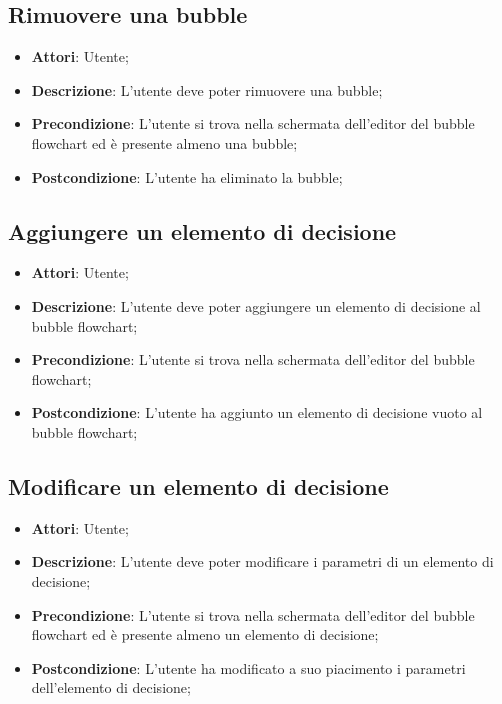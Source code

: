 \documentclass[../AnalisiDeiRequisiti.tex]{subfiles}
\begin{document}
	\subsection{Rimuovere una bubble}
	\begin{itemize}
		\item \textbf{Attori}: Utente;
		\item \textbf{Descrizione}: L'utente deve poter rimuovere una bubble;
		\item \textbf{Precondizione}: L'utente si trova nella schermata dell'editor del bubble flowchart ed è presente almeno una bubble;
		\item \textbf{Postcondizione}: L'utente ha eliminato la bubble;
	\end{itemize}
	
	\subsection{Aggiungere un elemento di decisione}
	\begin{itemize}
		\item \textbf{Attori}: Utente;
		\item \textbf{Descrizione}: L'utente deve poter aggiungere un elemento di decisione al bubble flowchart;
		\item \textbf{Precondizione}: L'utente si trova nella schermata dell'editor del bubble flowchart;
		\item \textbf{Postcondizione}: L'utente ha aggiunto un elemento di decisione vuoto al bubble flowchart;
	\end{itemize}
	
	\subsection{Modificare un elemento di decisione}
	\begin{itemize}
		\item \textbf{Attori}: Utente;
		\item \textbf{Descrizione}: L'utente deve poter modificare i parametri di un elemento di decisione;
		\item \textbf{Precondizione}: L'utente si trova nella schermata dell'editor del bubble flowchart ed è presente almeno un elemento di decisione;
		\item \textbf{Postcondizione}: L'utente ha modificato a suo piacimento i parametri dell'elemento di decisione;
	\end{itemize}
	
\end{document}
